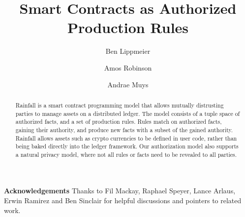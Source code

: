\documentclass[format=sigconf, review=true, screen=true]{acmart}
\begin{document}

\title
{       Smart Contracts as Authorized Production Rules}



\author{Ben Lippmeier}

\author{Amos Robinson}

\author{Andrae Muys}

\begin{abstract}
Rainfall is a smart contract programming model that allows mutually distrusting parties to manage assets on a distributed ledger. The model consists of a tuple space of authorized facts, and a set of production rules. Rules match on authorized facts, gaining their authority, and produce new facts with a subset of the gained authority. Rainfall allows assets such as crypto currencies to be defined in user code, rather than being baked directly into the ledger framework. Our authorization model also supports a natural privacy model, where not all rules or facts need to be revealed to all parties.
\end{abstract}

\maketitle
\makeatactive










\textbf{Acknowledgements}
Thanks to Fil Mackay, Raphael Speyer, Lance Arlaus, Erwin Ramirez and Ben Sinclair for helpful discussions and pointers to related work.




\clearpage{}


\end{document}
